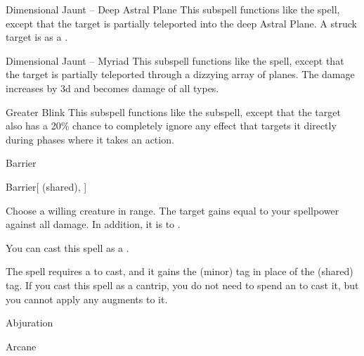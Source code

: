 \begin{ability}[\nth{6}]{Dimensional Jaunt -- Deep Astral Plane}
This subspell functions like the  spell, except that the target is partially teleported into the deep Astral Plane.
A struck target is  as a .
\end{ability}
\vspace{0.25em}


\begin{ability}[\nth{9}]{Dimensional Jaunt -- Myriad}
This subspell functions like the  spell, except that the target is partially teleported through a dizzying array of planes.
The damage increases by \plus3d and becomes damage of all types.
\end{ability}
\vspace{0.25em}


\begin{ability}[\nth{9}]{Greater Blink}
This subspell functions like the  subspell, except that the target also has a 20\% chance to completely ignore any effect that targets it directly during phases where it takes an action.
\end{ability}
\vspace{0.25em}

\newpage
\begin{spellsection}{Barrier}

\begin{spellheader}
\end{spellheader}


\begin{ability}{Barrier}[ (shared), ]

Choose a willing creature in \rngclose range.
The target gains  equal to your spellpower against all damage.
In addition, it is  to .

You can cast this spell as a .

\end{ability}



 The spell requires a  to cast, and it gains the  (minor) tag in place of the  (shared) tag. If you cast this spell as a cantrip,
you do not need to spend an  to cast it,
but you cannot apply any augments to it.


 Abjuration

 Arcane
\end{spellsection}


